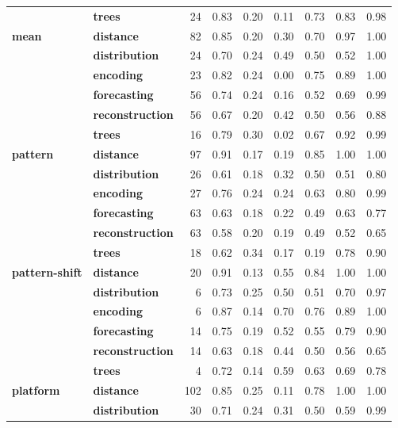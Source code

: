 \begin{table}
\begin{tabular}{llrrrrrrr}
\textbf{} & \textbf{trees} & 24 & 0.83 & 0.20 & 0.11 & 0.73 & 0.83 & 0.98 \\
\cline{1-9}
\multirow[t]{6}{*}{\textbf{mean}} & \textbf{distance} & 82 & 0.85 & 0.20 & 0.30 & 0.70 & 0.97 & 1.00 \\
\textbf{} & \textbf{distribution} & 24 & 0.70 & 0.24 & 0.49 & 0.50 & 0.52 & 1.00 \\
\textbf{} & \textbf{encoding} & 23 & 0.82 & 0.24 & 0.00 & 0.75 & 0.89 & 1.00 \\
\textbf{} & \textbf{forecasting} & 56 & 0.74 & 0.24 & 0.16 & 0.52 & 0.69 & 0.99 \\
\textbf{} & \textbf{reconstruction} & 56 & 0.67 & 0.20 & 0.42 & 0.50 & 0.56 & 0.88 \\
\textbf{} & \textbf{trees} & 16 & 0.79 & 0.30 & 0.02 & 0.67 & 0.92 & 0.99 \\
\cline{1-9}
\multirow[t]{6}{*}{\textbf{pattern}} & \textbf{distance} & 97 & 0.91 & 0.17 & 0.19 & 0.85 & 1.00 & 1.00 \\
\textbf{} & \textbf{distribution} & 26 & 0.61 & 0.18 & 0.32 & 0.50 & 0.51 & 0.80 \\
\textbf{} & \textbf{encoding} & 27 & 0.76 & 0.24 & 0.24 & 0.63 & 0.80 & 0.99 \\
\textbf{} & \textbf{forecasting} & 63 & 0.63 & 0.18 & 0.22 & 0.49 & 0.63 & 0.77 \\
\textbf{} & \textbf{reconstruction} & 63 & 0.58 & 0.20 & 0.19 & 0.49 & 0.52 & 0.65 \\
\textbf{} & \textbf{trees} & 18 & 0.62 & 0.34 & 0.17 & 0.19 & 0.78 & 0.90 \\
\cline{1-9}
\multirow[t]{6}{*}{\textbf{pattern-shift}} & \textbf{distance} & 20 & 0.91 & 0.13 & 0.55 & 0.84 & 1.00 & 1.00 \\
\textbf{} & \textbf{distribution} & 6 & 0.73 & 0.25 & 0.50 & 0.51 & 0.70 & 0.97 \\
\textbf{} & \textbf{encoding} & 6 & 0.87 & 0.14 & 0.70 & 0.76 & 0.89 & 1.00 \\
\textbf{} & \textbf{forecasting} & 14 & 0.75 & 0.19 & 0.52 & 0.55 & 0.79 & 0.90 \\
\textbf{} & \textbf{reconstruction} & 14 & 0.63 & 0.18 & 0.44 & 0.50 & 0.56 & 0.65 \\
\textbf{} & \textbf{trees} & 4 & 0.72 & 0.14 & 0.59 & 0.63 & 0.69 & 0.78 \\
\cline{1-9}
\multirow[t]{6}{*}{\textbf{platform}} & \textbf{distance} & 102 & 0.85 & 0.25 & 0.11 & 0.78 & 1.00 & 1.00 \\
\textbf{} & \textbf{distribution} & 30 & 0.71 & 0.24 & 0.31 & 0.50 & 0.59 & 0.99 \\

\end{tabular}
\end{table}
